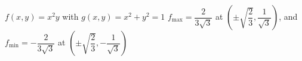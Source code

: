 {$f(x,y) = x^2 y$ with $g(x,y) = x^2 + y^2 = 1$
}
{$f_{\text{max}} = \dfrac{2}{3\sqrt{3}}$ at $\left( \pm \sqrt{\dfrac{2}{3}}, \dfrac{1}{\sqrt{3}} \right)$, and $f_{\text{min}} = -\dfrac{2}{3\sqrt{3}}$ at $\left( \pm \sqrt{\dfrac{2}{3}}, -\dfrac{1}{\sqrt{3}} \right)$}